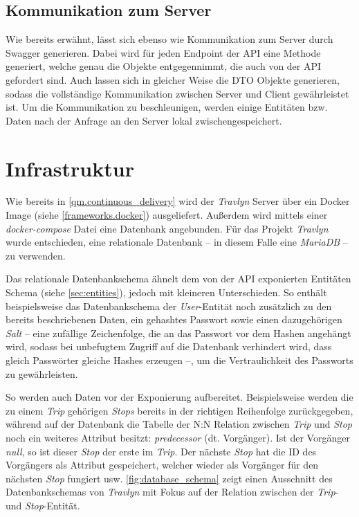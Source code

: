 		\subsection{Kommunikation zum Server}  %
		
			Wie bereits erwähnt, lässt sich ebenso wie Kommunikation zum Server durch Swagger generieren. Dabei wird für jeden Endpoint der \acs{API} eine Methode generiert, welche genau die Objekte entgegennimmt, die auch von der \acs{API} gefordert sind. Auch lassen sich in gleicher Weise die \acs{DTO} Objekte generieren, sodass die vollständige Kommunikation zwischen Server und Client gewährleistet ist. Um die Kommunikation zu beschleunigen, werden einige Entitäten bzw. Daten nach der Anfrage an den Server lokal zwischengespeichert. 

	\section{Infrastruktur} %
	
		Wie bereits in \autoref{qm.continuous_delivery} wird der \textit{Travlyn} Server über ein Docker Image (siehe \autoref{frameworks.docker}) ausgeliefert. Außerdem wird mittels einer \textit{docker-compose} Datei eine Datenbank angebunden. Für das Projekt \textit{Travlyn} wurde entschieden, eine relationale Datenbank -- in diesem Falle eine \textit{MariaDB} -- zu verwenden. 
		
		Das relationale Datenbankschema ähnelt dem von der \acs{API} exponierten Entitäten Schema (siehe \autoref{sec:entities}), jedoch mit kleineren Unterschieden. So enthält beispielsweise das Datenbankschema der \textit{User}-Entität noch zusätzlich zu den bereits beschriebenen Daten, ein gehashtes Passwort sowie einen dazugehörigen \textit{Salt} -- eine zufällige Zeichenfolge, die an das Passwort vor dem Hashen angehängt wird, sodass bei unbefugtem Zugriff auf die Datenbank verhindert wird, dass gleich Passwörter gleiche Hashes erzeugen --, um die Vertraulichkeit des Passworts zu gewährleisten. 
		
		So werden auch Daten vor der Exponierung aufbereitet. Beispielsweise werden die zu einem \textit{Trip} gehörigen \textit{Stops} bereits in der richtigen Reihenfolge zurückgegeben, während auf der Datenbank die Tabelle der N:N Relation zwischen \textit{Trip} und \textit{Stop} noch ein weiteres Attribut besitzt: \textit{predecessor} (dt. Vorgänger). Ist der Vorgänger \textit{null}, so ist dieser \textit{Stop} der erste im \textit{Trip}. Der nächste \textit{Stop} hat die ID des Vorgängers als Attribut gespeichert, welcher wieder als Vorgänger für den nächsten \textit{Stop} fungiert usw. \autoref{fig:database_schema} zeigt einen Ausschnitt des Datenbankschemas von \textit{Travlyn} mit Fokus auf der Relation zwischen der \textit{Trip}- und \textit{Stop}-Entität.
		
